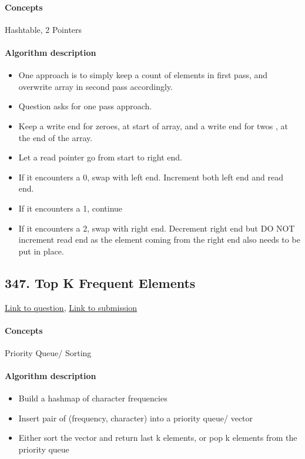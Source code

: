 \documentclass[11pt]{book}
\begin{document}
\paragraph{Concepts}
Hashtable, 2 Pointers
\paragraph{Algorithm description}
\begin{itemize}
    \item One approach is to simply keep a count of elements in first pass, and overwrite array in second pass accordingly.
    \item Question asks for one pass approach.
    \item Keep a write end for zeroes, at start of array, and a write end for twos , at the end of the array.
    \item Let a read pointer go from start to right end.
    \item If it encounters a 0, swap with left end. Increment both left end and read end.
    \item If it encounters a 1, continue
    \item If it encounters a 2, swap with right end. Decrement right end but DO NOT increment read end as the element coming from the right end 
    also needs to be put in place.
\end{itemize}

\subsection{347. Top K Frequent Elements}
\href{https://leetcode.com/problems/top-k-frequent-elements/}{Link to question},
\href{https://leetcode.com/submissions/detail/339839836/}{Link to submission}
\paragraph{Concepts}
Priority Queue/ Sorting
\paragraph{Algorithm description}
\begin{itemize}
    \item Build a hashmap of character frequencies
    \item Insert pair of (frequency, character) into a priority queue/ vector
    \item Either sort the vector and return last k elements, or pop k elements from the priority queue
\end{itemize}
\end{document}
